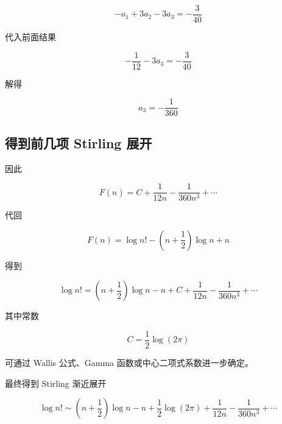 \documentclass[11pt]{article}%
\begin{document}
    \[
    -a_1+3a_2-3a_3
    =
    -\frac3{40}
    \]

    \vspace{1em}
    代入前面结果

    \[
    -\frac1{12}-3a_3
    =
    -\frac3{40}
    \]

    \vspace{1em}
    解得

    \[
    \boxed{
    a_3=-\frac1{360}
    }
    \]

    \subsection{得到前几项 Stirling 展开}

    因此

    \[
    F(n)
    =
    C
    +\frac1{12n}
    -\frac1{360n^3}
    +\cdots
    \]

    \vspace{1em}
    代回

    \[
    F(n)
    =
    \log n!
    -
    \left(n+\frac12\right)\log n
    +n
    \]

    \vspace{1em}
    得到

    \[
    \boxed{
    \log n!
    =
    \left(n+\frac12\right)\log n
    -n
    +C
    +\frac1{12n}
    -\frac1{360n^3}
    +\cdots
    }
    \]

    \vspace{1em}
    其中常数

    \[
    C
    =
    \frac12\log(2\pi)
    \]

    \vspace{1em}
    可通过 Wallis 公式、Gamma 函数或中心二项式系数进一步确定。

    最终得到 Stirling 渐近展开

    \[
    \boxed{
    \log n!
    \sim
    \left(n+\frac12\right)\log n
    -n
    +\frac12\log(2\pi)
    +\frac1{12n}
    -\frac1{360n^3}
    +\cdots
    }
    \]
\end{document}
